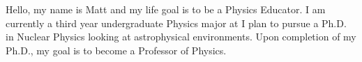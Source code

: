 \documentclass[a4paper,12pt]{article}
\begin{document}
\begin{center}
    Hello, my name is Matt and my life goal is to be a Physics Educator.  I am currently a third year undergraduate Physics major at   I plan to pursue a Ph.D. in Nuclear Physics looking at astrophysical environments.  Upon completion of my Ph.D., my goal is to become a Professor of Physics.
\end{center}
\end{document}
